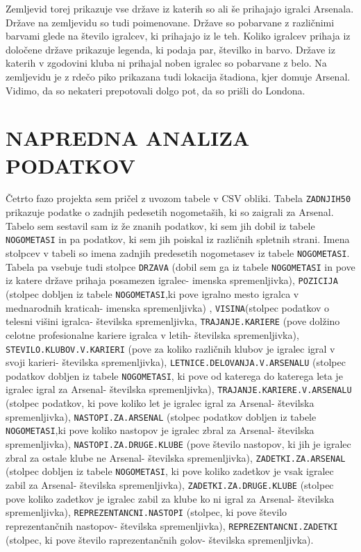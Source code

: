 \documentclass[11pt,a4paper]{article}
\begin{document}
Zemljevid torej prikazuje vse države iz katerih so ali še prihajajo igralci Arsenala. Države na zemljevidu so tudi poimenovane. Države so pobarvane z različnimi barvami glede na število igralcev, ki prihajajo iz le teh. Koliko igralcev prihaja iz določene države prikazuje legenda, ki podaja par, številko in barvo. Države iz katerih v zgodovini kluba ni prihajal noben igralec so pobarvane z belo. Na zemljevidu je z rdečo piko prikazana tudi lokacija štadiona, kjer domuje Arsenal. Vidimo, da so nekateri prepotovali dolgo pot, da so prišli do Londona.



\section{NAPREDNA ANALIZA PODATKOV}
Četrto fazo projekta sem pričel z uvozom tabele v CSV obliki. Tabela \verb|ZADNJIH50| prikazuje podatke o zadnjih pedesetih nogometaših, ki so zaigrali za Arsenal. Tabelo sem sestavil sam iz že znanih podatkov, ki sem jih dobil iz tabele \verb|NOGOMETASI| in pa podatkov, ki sem jih poiskal iz različnih spletnih strani. Imena stolpcev v tabeli so imena zadnjih predesetih nogometasev iz tabele \verb|NOGOMETASI|. Tabela pa vsebuje tudi stolpce \verb|DRZAVA| (dobil sem ga iz tabele \verb|NOGOMETASI| in pove iz katere države prihaja posamezen igralec- imenska spremenljivka), \verb|POZICIJA| (stolpec dobljen iz tabele \verb|NOGOMETASI|,ki pove igralno mesto igralca v mednarodnih kraticah- imenska spremenljivka) , \verb|VISINA|(stolpec podatkov o telesni višini igralca- številska spremenljivka, \verb|TRAJANJE.KARIERE| (pove dolžino celotne profesionalne kariere igralca v letih- številska spremenljivka), \verb|STEVILO.KLUBOV.V.KARIERI| (pove za koliko različnih klubov je igralec igral v svoji karieri- številska spremenljivka), \verb|LETNICE.DELOVANJA.V.ARSENALU| (stolpec podatkov dobljen iz tabele \verb|NOGOMETASI|, ki pove od katerega do katerega leta je igralec igral za Arsenal- številska spremenljivka), \verb|TRAJANJE.KARIERE.V.ARSENALU| (stolpec podatkov, ki pove koliko let je igralec igral za Arsenal- številska spremenljivka), \verb|NASTOPI.ZA.ARSENAL| (stolpec podatkov dobljen iz tabele \verb|NOGOMETASI|,ki pove koliko nastopov je igralec zbral za Arsenal- številska spremenljivka), \verb|NASTOPI.ZA.DRUGE.KLUBE| (pove število nastopov, ki jih je igralec zbral za ostale klube ne Arsenal- številska spremenljivka), \verb|ZADETKI.ZA.ARSENAL| (stolpec dobljen iz tabele \verb|NOGOMETASI|, ki pove koliko zadetkov je vsak igralec zabil za Arsenal- številska spremenljivka), \verb|ZADETKI.ZA.DRUGE.KLUBE| (stolpec pove koliko zadetkov je igralec zabil za klube ko ni igral za Arsenal- številska spremenljivka), \verb|REPREZENTANCNI.NASTOPI| (stolpec, ki pove število reprezentančnih nastopov- številska spremenljivka), \verb|REPREZENTANCNI.ZADETKI| (stolpec, ki pove število raprezentančnih golov- številska spremenljivka).
\end{document}
